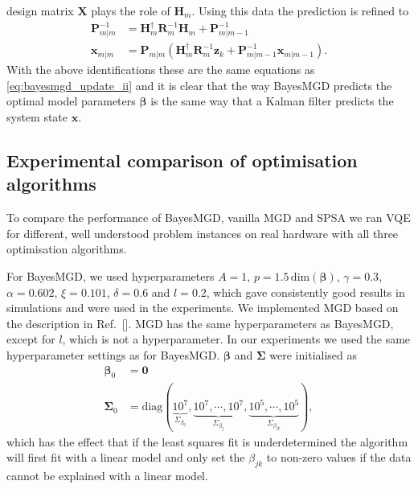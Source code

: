\documentclass[aps,prb,twoside,superscriptaddress,longbibliography,nofootinbib,floatfix, notitlepage,twocolumn]{revtex4-1}
\renewcommand{\vec}[1]{\boldsymbol{#1}}
\begin{document}
{design matrix $\vec X$ plays the role of $\vec H_m$. Using this data the
prediction is refined to 
\begin{equation}
\begin{aligned}
    \vec P_{m|m}^{-1} &= \vec H^\dagger_m \vec R_m^{-1} \vec H_m
                       + \vec P_{m|m-1}^{-1} \\
    \vec x_{m|m} &= \vec P_{m|m} (\vec H^\dagger_m \vec R_m^{-1} \vec z_k
                                 + \vec P_{m|m-1}^{-1} \vec x_{m|m-1}).
\end{aligned}
\end{equation}
With the above identifications these are the same equations as
\eqref{eq:bayesmgd_update_ii} and it is clear that the way BayesMGD predicts the 
optimal model parameters $\vec\beta$ is the same way that a Kalman filter predicts the system 
state $\vec x$.
 
\subsection{Experimental comparison of optimisation algorithms}
\label{sec:experimental-comparison-of-optimisation-algorithms}

To compare the performance of BayesMGD, vanilla MGD and SPSA we ran VQE for different, well
understood problem instances on real hardware with all three 
optimisation algorithms.

For BayesMGD, we used hyperparameters $A=1$, $p = 1.5 \, \mathrm{dim}(\vec\beta)$, $\gamma=0.3$,
$\alpha=0.602$, $\xi=0.101$, $\delta=0.6$ and $l = 0.2$, which gave consistently good 
results in simulations and were used in the experiments. We implemented MGD based on the description in Ref.~[]. MGD has the same hyperparameters as BayesMGD, except for $l$, which is not a hyperparameter. In our experiments we used the same hyperparameter settings as for BayesMGD.
$\vec\beta$ and $\vec\Sigma$ were initialised as %
\begin{equation}
\begin{aligned}
    \vec\beta_0 &= \vec0 \\
    \vec\Sigma_0 &= \mathrm{diag}(
    \underbrace{10^7}_{\Sigma_{\beta_0}},
    \underbrace{10^7, \cdots, 10^7}_{\Sigma_{\beta_j}},
    \underbrace{10^5, \cdots, 10^5}_{\Sigma_{\beta_{jk}}}
    ),
\end{aligned}
\end{equation}
which has the effect that if the least squares fit is underdetermined the algorithm
will first fit with a linear model and only set the $\beta_{jk}$ to non-zero
values if the data cannot be explained with a linear model.

}
\end{document}

